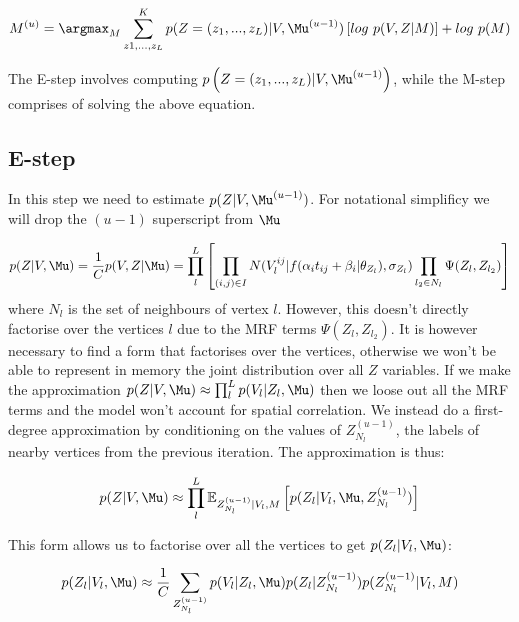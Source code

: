 \begin{equation}
\label{eq:EM1}
M^{(u)} = \argmax_{M} \sum_{z1,\dots, z_L}^K p(Z = (z_1, ..., z_L) | V, \Mu^{(u-1)}) \left[log\ p(V,Z|M)\right] + log\ p(M) 
\end{equation}


The E-step involves computing $p\left(Z = (z_1, ..., z_L)| V, \Mu^{(u-1)}\right)$, while the M-step comprises of solving the above equation. 


\subsection{E-step}

In this step we need to estimate $p(Z | V, \Mu^{(u-1)})$. For notational simplificy we will drop the $(u-1)$ superscript from $\Mu$

\begin{equation}
 p(Z | V, \Mu) = \frac{1}{C}  p(V, Z | \Mu) =  \prod_l^L \left[ \prod_{(i,j) \in I} N(V_l^{ij} | f(\alpha_i t_{ij} + \beta_i | \theta_{Z_l}), \sigma_{Z_l})  \prod_{l_2 \in N_l} \Psi (Z_{l}, Z_{l_2}) \right]
\end{equation}
where $N_l$ is the set of neighbours of vertex $l$. However, this doesn't directly factorise over the vertices $l$ due to the MRF terms $\Psi (Z_{l}, Z_{l_2})$. It is however necessary to find a form that factorises over the vertices, otherwise we won't be able to represent in memory the joint distribution over all $Z$ variables. If we make the approximation $p(Z | V, \Mu) \approx \prod_l^L p(V_l|Z_l, \Mu)$ then we loose out all the MRF terms and the model won't account for spatial correlation. We instead do a first-degree approximation by conditioning on the values of $Z_{N_l}^{(u-1)}$, the labels of nearby vertices from the previous iteration. The approximation is thus:

\begin{equation}
\label{eq:app_e_approx}
 p(Z | V, \Mu) \approx \prod_l^L \mathbb{E}_{Z_{N_l}^{(u-1)}|V_l, M} \left[ p(Z_l|V_l, \Mu, Z_{N_l}^{(u-1)}) \right]
\end{equation}

This form allows us to factorise over all the vertices to get $p(Z_l | V_l, \Mu)$:

\begin{equation}
 p(Z_l | V_l, \Mu) \approx \frac{1}{C} \sum_{Z_{N_l}^{(u-1)}} p(V_l|Z_l, \Mu) p(Z_l|Z_{N_l}^{(u-1)}) p(Z_{N_l}^{(u-1)}|V_l, M) 
\end{equation}

